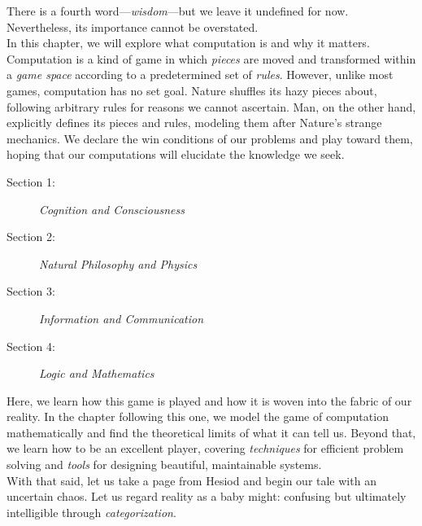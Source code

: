 There is a fourth word---\textit{wisdom}---but we leave it undefined for now. Nevertheless, its importance cannot be overstated. \\



In this chapter, we will explore what computation is and why it matters. Computation is a kind of game in which \textit{pieces} are moved and transformed within a \textit{game space} according to a predetermined set of \textit{rules}. However, unlike most games, computation has no set goal. Nature shuffles its hazy pieces about, following arbitrary rules for reasons we cannot ascertain. Man, on the other hand, explicitly defines its pieces and rules, modeling them after Nature's strange mechanics. We declare the win conditions of our problems and play toward them, hoping that our computations will elucidate the knowledge we seek. \\

\begin{description}
	\item[Section 1:] \textit{Cognition and Consciousness}
	\item[Section 2:] \textit{Natural Philosophy and Physics}
	\item[Section 3:] \textit{Information and Communication}
	\item[Section 4:] \textit{Logic and Mathematics} \\
\end{description}

Here, we learn how this game is played and how it is woven into the fabric of our reality. In the chapter following this one, we model the game of computation mathematically and find the theoretical limits of what it can tell us. Beyond that, we learn how to be an excellent player, covering \textit{techniques} for efficient problem solving and \textit{tools} for designing beautiful, maintainable systems. \\


With that said, let us take a page from Hesiod and begin our tale with an uncertain chaos. Let us regard reality as a baby might: confusing but ultimately intelligible through \textit{categorization}. \\


